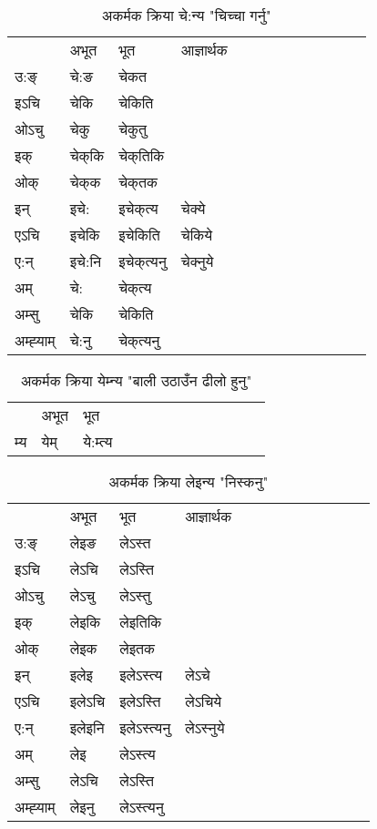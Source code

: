 \begin{table}[H]
\centering
\caption{\label{ek.vi} अकर्मक क्रिया  चे:न्य  "चिच्चा गर्नु"  }
\begin{tabular}{l|l|l|l|l|l|l|l|l|l|l|l|l}  \toprule
&अभूत & भूत & आज्ञार्थक \\ 
उ:ङ्‌ &चे:ङ &चेकत \\ 
इऽचि &चेकि &चेकिति   \\ 
ओऽचु &चेकु &चेकुतु   \\ 
इक् &चेक्‌कि &चेक्‌तिकि   \\ 
ओक् &चेक्‌क &चेक्‌तक   \\ 
इन् & इचे: & इचेक्‌त्य &चेक्ये  \\ 
एऽचि & इचेकि & इचेकिति &चेकिये    \\ 
ए:न् & इचे:नि  & इचेक्‌त्यनु &चेक्‍नुये  \\ 
अम् & चे: & चेक्‌त्य   \\ 
अम्सु & चेकि & चेकिति   \\ 
अम्ह्‍याम् & चे:नु  & चेक्‌त्यनु \\ 
\bottomrule
\end{tabular}
\end{table}


\begin{table}[H]
\centering
\caption{\label{em.vi} अकर्मक क्रिया  येम्‍न्य  "बाली उठाउँन ढीलो हुनु"  }
\begin{tabular}{l|l|l|l|l|l|l|l|l|l|l|l|l}  \toprule
&अभूत & भूत   \\ 
म्य & येम् & ये:म्त्य   \\ 
\bottomrule
\end{tabular}
\end{table}


\begin{table}[H]
\centering
\caption{\label{en.vi} अकर्मक क्रिया  लेइन्य  "निस्कनु"  }
\begin{tabular}{l|l|l|l|l|l|l|l|l|l|l|l|l}  \toprule
&अभूत & भूत & आज्ञार्थक \\ 
उ:ङ्‌ &लेइङ &लेऽस्त \\ 
इऽचि &लेऽचि &लेऽस्ति   \\ 
ओऽचु &लेऽचु &लेऽस्तु   \\ 
इक् &लेइकि &लेइतिकि   \\ 
ओक् &लेइक &लेइतक   \\ 
इन् & इलेइ & इलेऽस्त्य &लेऽचे  \\ 
एऽचि & इलेऽचि & इलेऽस्ति &लेऽचिये    \\ 
ए:न् & इलेइनि  & इलेऽस्त्यनु &लेऽस्‍नुये  \\ 
अम् & लेइ & लेऽस्त्य   \\ 
अम्सु & लेऽचि & लेऽस्ति   \\ 
अम्ह्‍याम् & लेइनु  & लेऽस्त्यनु \\ 
\bottomrule
\end{tabular}
\end{table}


